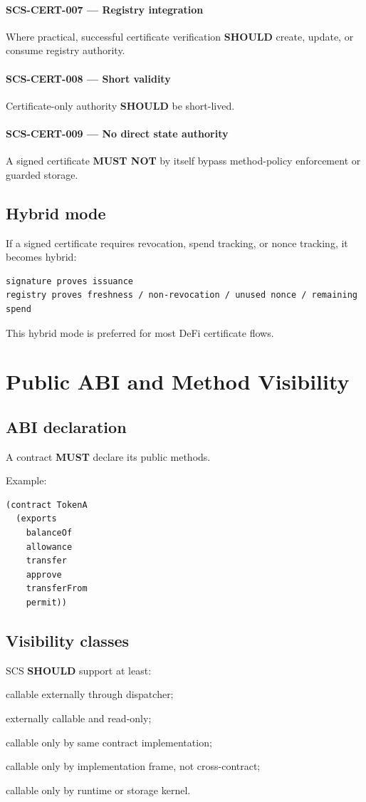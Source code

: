 \documentclass[11pt]{article}
\newcommand{\SCS}{\textsc{SCS}}
\newcommand{\MUST}{\textbf{MUST}}
\newcommand{\MUSTNOT}{\textbf{MUST NOT}}
\newcommand{\SHOULD}{\textbf{SHOULD}}
\newcommand{\req}[2]{\paragraph{#1}#2\par}
\begin{document}
\req{SCS-CERT-007 --- Registry integration}{Where practical, successful certificate verification \SHOULD{} create, update, or consume registry authority.}

\req{SCS-CERT-008 --- Short validity}{Certificate-only authority \SHOULD{} be short-lived.}

\req{SCS-CERT-009 --- No direct state authority}{A signed certificate \MUSTNOT{} by itself bypass method-policy enforcement or guarded storage.}

\subsection{Hybrid mode}

If a signed certificate requires revocation, spend tracking, or nonce tracking, it becomes hybrid:

\begin{lstlisting}
signature proves issuance
registry proves freshness / non-revocation / unused nonce / remaining spend
\end{lstlisting}

This hybrid mode is preferred for most DeFi certificate flows.



\section{Public ABI and Method Visibility}

\subsection{ABI declaration}

A contract \MUST{} declare its public methods.

Example:

\begin{lstlisting}
(contract TokenA
  (exports
    balanceOf
    allowance
    transfer
    approve
    transferFrom
    permit))
\end{lstlisting}

\subsection{Visibility classes}

\SCS{} \SHOULD{} support at least:

\begin{description}[leftmargin=2.8cm]
  \item[public] callable externally through dispatcher;
  \item[view] externally callable and read-only;
  \item[internal] callable only by same contract implementation;
  \item[private] callable only by implementation frame, not cross-contract;
  \item[kernel] callable only by runtime or storage kernel.
\end{description}
\end{document}
